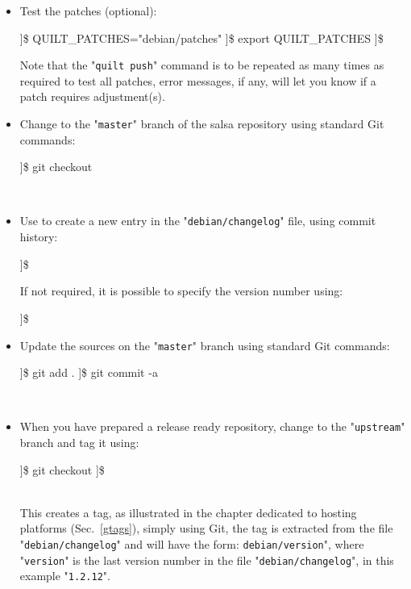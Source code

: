 \begin{itemize}
\item Test the patches (optional):
\vspace{-0.25cm}
\begin{scripti}
]\$ QUILT\_PATCHES="debian/patches"
]\$ export QUILT\_PATCHES
]\$  
\end{scripti}
\noindent Note that the "\texttt{quilt push}" command is to be repeated as many times as required to test all patches, 
error messages, if any, will let you know if a patch requires adjustment(s).
\item Change to the "\texttt{master}" branch of the salsa repository using standard Git commands: 
\vspace{-0.25cm}
\begin{scripti}
]\$ git checkout 
\end{scripti}
\\[-1.25cm]
\item Use  to create a new entry in the "\texttt{debian/changelog}" file, using commit history:
\vspace{-0.25cm}
\begin{scripti}
]\$   
\end{scripti}
\noindent If not required, it is possible to specify the version number using:
\vspace{-0.25cm}
\begin{scripti}
]\$   
\end{scripti}
\item Update the sources on the "\texttt{master}" branch using standard Git commands: 
\vspace{-0.25cm}
\begin{scripti}
]\$ git add .
]\$ git commit -a
\end{scripti}
\\[-1.25cm]
\item When you have prepared a release ready repository, change to the "\texttt{upstream}" branch and tag it using:
\vspace{-0.25cm}
\begin{scripti}
]\$ git checkout 
]\$   
\end{scripti}
\\[-0.75cm]
\noindent This creates a tag, as illustrated in the chapter dedicated to hosting platforms (Sec.~\ref{gtags}), simply using Git, the tag is extracted from the file "\texttt{debian/changelog}" and will have the form: \texttt{debian/version}", where "\texttt{version}" is the last version number in the file "\texttt{debian/changelog}", in this example "\texttt{1.2.12}".

\end{itemize}
